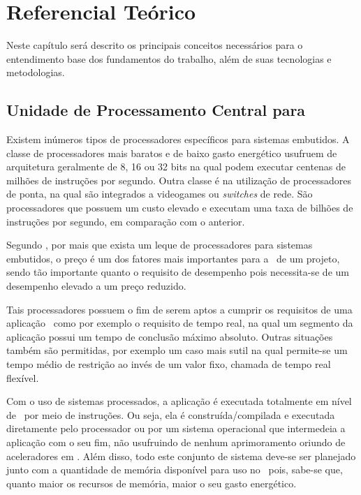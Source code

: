 \chapter{Referencial Teórico} \label{chap:revisao_bibliografica}

Neste capítulo será descrito os principais conceitos necessários para o entendimento base dos fundamentos do trabalho, além de suas tecnologias e metodologias.

\section{Unidade de Processamento Central para \Wearables}
   Existem inúmeros tipos de processadores específicos para sistemas embutidos.
   A classe de processadores mais baratos e de baixo gasto energético usufruem de arquitetura geralmente de 8, 16 ou 32 bits na qual podem executar centenas de milhões de instruções por segundo.
   Outra classe é na utilização de processadores de ponta, na qual são integrados a videogames ou \textit{switches} de rede.
   São processadores que possuem um custo elevado e executam uma taxa de bilhões de instruções por segundo, em comparação com o anterior.

   Segundo \citet{Hennessy2011}, por mais que exista um leque de processadores para sistemas embutidos, o preço é um dos fatores mais importantes para a \design\ de um projeto, sendo tão importante quanto o requisito de desempenho pois necessita-se de um desempenho elevado a um preço reduzido.

   Tais processadores possuem o fim de serem aptos a cumprir os requisitos de uma aplicação \wearable\ como por exemplo o requisito de tempo real, na qual um segmento da aplicação possui um tempo de conclusão máximo absoluto.
   Outras situações também são permitidas, por exemplo um caso mais sutil na qual permite-se um tempo médio de restrição ao invés de um valor fixo, chamada de tempo real flexível.

   Com o uso de sistemas processados, a aplicação é executada totalmente em nível de \software\ por meio de instruções. Ou seja, ela é construída/compilada e executada diretamente pelo processador ou por um sistema operacional que intermedeia a aplicação com o seu fim, não usufruindo de nenhum aprimoramento oriundo de aceleradores em \hardware.
   Além disso, todo este conjunto de sistema deve-se ser planejado junto com a quantidade de memória disponível para uso no \wearable\ pois, sabe-se que, quanto maior os recursos de memória, maior o seu gasto energético.




